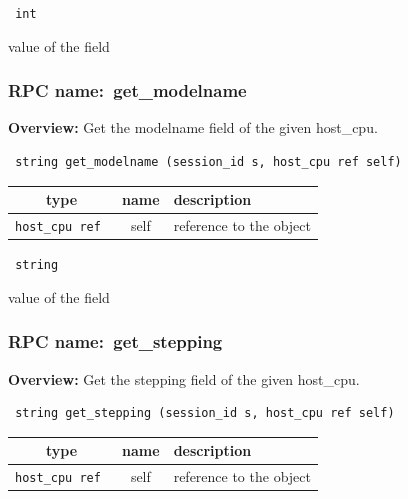 {\tt 
int
}


value of the field
\vspace{0.3cm}
\vspace{0.3cm}
\vspace{0.3cm}
\subsubsection{RPC name:~get\_modelname}

{\bf Overview:} 
Get the modelname field of the given host\_cpu.

\begin{verbatim} string get_modelname (session_id s, host_cpu ref self)\end{verbatim}



 
\vspace{0.3cm}
\begin{tabular}{|c|c|p{7cm}|}
 \hline
{\bf type} & {\bf name} & {\bf description} \\ \hline
{\tt host\_cpu ref } & self & reference to the object \\ \hline 

\end{tabular}

\vspace{0.3cm}

{\tt 
string
}


value of the field
\vspace{0.3cm}
\vspace{0.3cm}
\vspace{0.3cm}
\subsubsection{RPC name:~get\_stepping}

{\bf Overview:} 
Get the stepping field of the given host\_cpu.

\begin{verbatim} string get_stepping (session_id s, host_cpu ref self)\end{verbatim}



 
\vspace{0.3cm}
\begin{tabular}{|c|c|p{7cm}|}
 \hline
{\bf type} & {\bf name} & {\bf description} \\ \hline
{\tt host\_cpu ref } & self & reference to the object \\ \hline 

\end{tabular}

